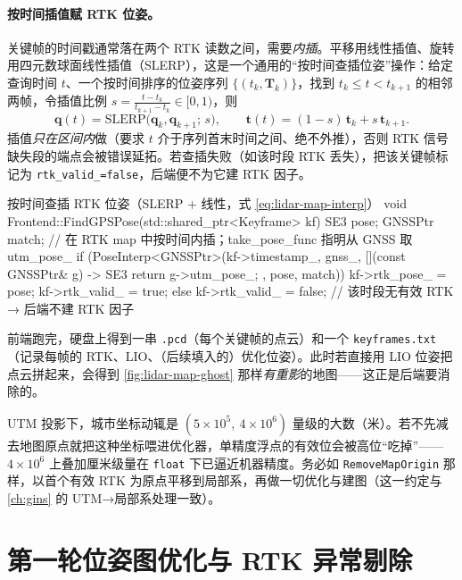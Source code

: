 \paragraph{按时间插值赋 RTK 位姿。}
关键帧的时间戳通常落在两个 RTK 读数之间，需要\emph{内插}。平移用线性插值、旋转用四元数球面线性插值（SLERP），这是一个通用的“按时间查插位姿”操作：给定查询时间 $t$、一个按时间排序的位姿序列 $\{(t_k,\mathbf{T}_k)\}$，找到 $t_k\le t< t_{k+1}$ 的相邻两帧，令插值比例 $s=\frac{t-t_k}{t_{k+1}-t_k}\in[0,1)$，则
\begin{equation}
\label{eq:lidar-map-interp}
\mathbf{q}(t)=\mathrm{SLERP}\big(\mathbf{q}_k,\mathbf{q}_{k+1};\,s\big),\qquad
\mathbf{t}(t)=(1-s)\,\mathbf{t}_k+s\,\mathbf{t}_{k+1}.
\end{equation}
插值\emph{只在区间内}做（要求 $t$ 介于序列首末时间之间、绝不外推），否则 RTK 信号缺失段的端点会被错误延拓。若查插失败（如该时段 RTK 丢失），把该关键帧标记为 \texttt{rtk\_valid\_=false}，后端便不为它建 RTK 因子。

\begin{codebox}[C++]{按时间查插 RTK 位姿（SLERP + 线性，式 \ref{eq:lidar-map-interp}）}
void Frontend::FindGPSPose(std::shared_ptr<Keyframe> kf) {
  SE3 pose; GNSSPtr match;
  // 在 RTK map 中按时间内插；take_pose_func 指明从 GNSS 取 utm_pose_
  if (PoseInterp<GNSSPtr>(kf->timestamp_, gnss_,
        [](const GNSSPtr& g) -> SE3 { return g->utm_pose_; }, pose, match)) {
    kf->rtk_pose_  = pose;
    kf->rtk_valid_ = true;
  } else {
    kf->rtk_valid_ = false;   // 该时段无有效 RTK → 后端不建 RTK 因子
  }
}
\end{codebox}

前端跑完，硬盘上得到一串 \texttt{.pcd}（每个关键帧的点云）和一个 \texttt{keyframes.txt}（记录每帧的 RTK、LIO、（后续填入的）优化位姿）。此时若直接用 LIO 位姿把点云拼起来，会得到 \cref{fig:lidar-map-ghost} 那样\emph{有重影}的地图——这正是后端要消除的。

\begin{pitfall}
UTM 投影下，城市坐标动辄是 $(5\times10^5,\ 4\times10^6)$ 量级的大数（米）。若不先减去地图原点就把这种坐标喂进优化器，单精度浮点的有效位会被高位“吃掉”——$4\times10^6$ 上叠加厘米级量在 \texttt{float} 下已逼近机器精度。务必如 \texttt{RemoveMapOrigin} 那样，以首个有效 RTK 为原点平移到局部系，再做一切优化与建图（这一约定与 \cref{ch:gins} 的 UTM→局部系处理一致）。
\end{pitfall}

\section{第一轮位姿图优化与 RTK 异常剔除}
\label{sec:lidar-map-pgo1}

